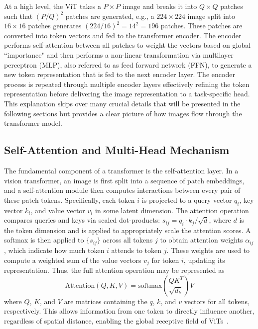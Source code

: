 \documentclass[runningheads,a4paper]{llncs}
\begin{document}
At a high level, the ViT takes a $P \times P$ image and breaks it into $Q \times Q$ patches such that $\left(P/Q\right)^2$ patches are generated, e.g., a $224 \times 224$ image split into $16 \times 16$ patches generates $\left(224/16\right)^2=14^2=196$ patches. These patches are converted into token vectors and fed to the transformer encoder. The encoder performs self-attention between all patches to weight the vectors based on global ``importance" and then performs a non-linear transformation via multilayer perceptron (MLP), also referred to as feed forward network (FFN), to generate a new token representation that is fed to the next encoder layer. The encoder process is repeated through multiple encoder layers effectively refining the token representation before delivering the image representation to a task-specific head. This explanation skips over many crucial details that will be presented in the following sections but provides a clear picture of how images flow through the transformer model.

\subsection{Self-Attention and Multi-Head Mechanism}
The fundamental component of a transformer is the self-attention layer. In a vision transformer, an image is first split into a sequence of patch embeddings, and a self-attention module then computes interactions between every pair of these patch tokens. Specifically, each token $i$ is projected to a query vector $q_i$, key vector $k_i$, and value vector $v_i$ in some latent dimension. The attention operation compares queries and keys via scaled dot-products: $s_{ij} = q_i \cdot k_j / \sqrt{d}$, where $d$ is the token dimension and is applied to appropriately scale the attention scores. A softmax is then applied to $\{s_{ij}\}$ across all tokens $j$ to obtain attention weights $\alpha_{ij}$, which indicate how much token $i$ attends to token $j$. These weights are used to compute a weighted sum of the value vectors $v_j$ for token $i$, updating its representation. Thus, the full attention operation may be represented as
\begin{equation}
    \text{Attention}(Q,K,V)=\text{softmax}\left(\frac{QK^T}{\sqrt{d_k}}\right)V
\end{equation}
where $Q$, $K$, and $V$ are matrices containing the $q$, $k$, and $v$ vectors for all tokens, respectively. This allows information from one token to directly influence another, regardless of spatial distance, enabling the global receptive field of ViTs~\cite{vaswani2017attention}.
\end{document}
